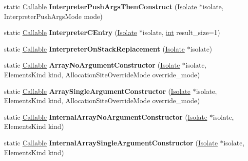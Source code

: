 \begin{DoxyCompactItemize}
\item 
\mbox{\label{classv8_1_1internal_1_1CodeFactory_aebffe85b2a85677a701e37a9d31ece79}} 
static \mbox{\hyperlink{classv8_1_1internal_1_1Callable}{Callable}} {\bfseries Interpreter\+Push\+Args\+Then\+Construct} (\mbox{\hyperlink{classv8_1_1internal_1_1Isolate}{Isolate}} $\ast$isolate, Interpreter\+Push\+Args\+Mode mode)
\item 
\mbox{\label{classv8_1_1internal_1_1CodeFactory_a9d19422679fa2875fa82f2c8725beefe}} 
static \mbox{\hyperlink{classv8_1_1internal_1_1Callable}{Callable}} {\bfseries Interpreter\+C\+Entry} (\mbox{\hyperlink{classv8_1_1internal_1_1Isolate}{Isolate}} $\ast$isolate, \mbox{\hyperlink{classint}{int}} result\+\_\+size=1)
\item 
\mbox{\label{classv8_1_1internal_1_1CodeFactory_a1037e2c269198f11b58d58f17bf3d938}} 
static \mbox{\hyperlink{classv8_1_1internal_1_1Callable}{Callable}} {\bfseries Interpreter\+On\+Stack\+Replacement} (\mbox{\hyperlink{classv8_1_1internal_1_1Isolate}{Isolate}} $\ast$isolate)
\item 
\mbox{\label{classv8_1_1internal_1_1CodeFactory_a1f3591f5d360372cb2d675acbc1d5d57}} 
static \mbox{\hyperlink{classv8_1_1internal_1_1Callable}{Callable}} {\bfseries Array\+No\+Argument\+Constructor} (\mbox{\hyperlink{classv8_1_1internal_1_1Isolate}{Isolate}} $\ast$isolate, Elements\+Kind kind, Allocation\+Site\+Override\+Mode override\+\_\+mode)
\item 
\mbox{\label{classv8_1_1internal_1_1CodeFactory_af69d6c4eb143985e21ff096fbb33dc8b}} 
static \mbox{\hyperlink{classv8_1_1internal_1_1Callable}{Callable}} {\bfseries Array\+Single\+Argument\+Constructor} (\mbox{\hyperlink{classv8_1_1internal_1_1Isolate}{Isolate}} $\ast$isolate, Elements\+Kind kind, Allocation\+Site\+Override\+Mode override\+\_\+mode)
\item 
\mbox{\label{classv8_1_1internal_1_1CodeFactory_a88f1bfc680b78d02d50deae542eb8e9c}} 
static \mbox{\hyperlink{classv8_1_1internal_1_1Callable}{Callable}} {\bfseries Internal\+Array\+No\+Argument\+Constructor} (\mbox{\hyperlink{classv8_1_1internal_1_1Isolate}{Isolate}} $\ast$isolate, Elements\+Kind kind)
\item 
\mbox{\label{classv8_1_1internal_1_1CodeFactory_a49d6a9169689e1e99e0a263d662ddef2}} 
static \mbox{\hyperlink{classv8_1_1internal_1_1Callable}{Callable}} {\bfseries Internal\+Array\+Single\+Argument\+Constructor} (\mbox{\hyperlink{classv8_1_1internal_1_1Isolate}{Isolate}} $\ast$isolate, Elements\+Kind kind)
\end{DoxyCompactItemize}


